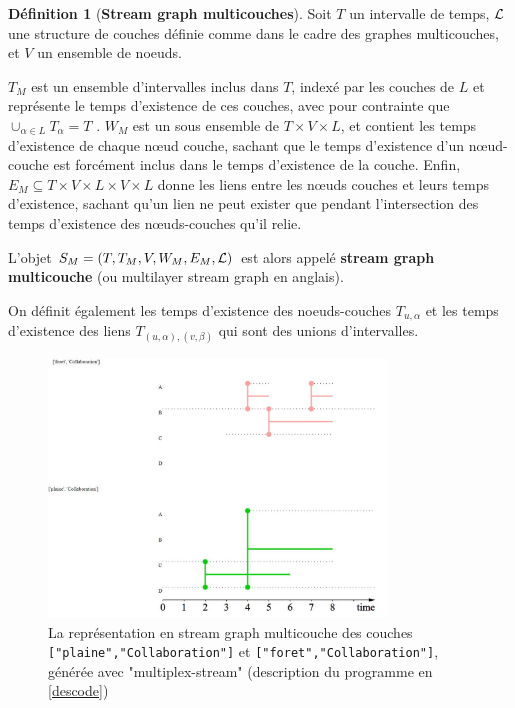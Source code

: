 \documentclass[11pt,a4paper]{article}
\theoremstyle{definition}
\newtheorem{defn}{Définition}
\theoremstyle{remark}
\theoremstyle{remark}
\def \stgm {stream graph multicouche}
\def \Stgm {Stream graph multicouches}
\begin{document}
\begin{defn}[\textbf{\Stgm}]
    
    Soit $T$ un intervalle de temps, ${\cal L}$ une structure de couches définie comme dans le cadre des graphes multicouches, et $V$ un ensemble de noeuds. 
    
    $T_M$ est un ensemble d'intervalles inclus dans $T$, indexé par les couches de $L$ et représente le temps d'existence de ces couches, avec pour contrainte que $\cup_{\alpha \in L} T_{\alpha} = T$ . $W_M$ est un sous ensemble de $T \times V \times L$, et contient les temps d'existence de chaque nœud couche, sachant que le temps d'existence d'un nœud-couche est forcément inclus dans le temps d'existence de la couche. Enfin, $E_M \subseteq T \times V \times L \times V \times L$ donne les liens entre les nœuds couches et leurs temps d'existence, sachant qu'un lien ne peut exister que pendant l'intersection des temps d'existence des nœuds-couches qu'il relie.
    
    L'objet $S_M = (T,T_M,V,W_M,E_M,{\cal L})$ est alors appelé \textbf{\stgm } (ou multilayer stream graph en anglais).
    
    On définit également les temps d'existence des noeuds-couches $T_{u,\alpha}$ et les temps d'existence des liens $T_{(u,\alpha),(v,\beta)}$ qui sont des unions d'intervalles.
	\end{defn}
	
	\begin{figure}[H]
		\centering
		\includegraphics[width=0.8\textwidth]{exMultiStream.JPG}
		\caption{La représentation en \stgm{} des couches \texttt{["plaine","Collaboration"]} et \texttt{["foret","Collaboration"]}, générée avec "multiplex-stream" (description du programme en \cref{descode})}
		\label{exstgm}
	\end{figure}
	
\end{document}
